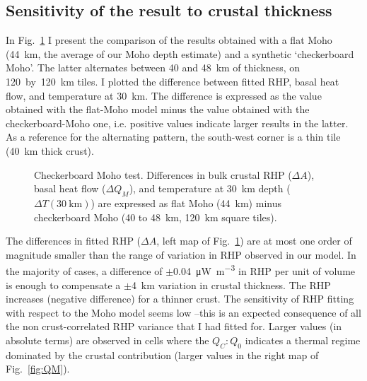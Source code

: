 \subsection{Sensitivity of the result to crustal thickness}
\label{ss:Appl:DiscTherm:Sens}

In Fig.~\ref{fig:CompCheckMoho} I present the comparison of the results obtained with a flat Moho (44~\si{\kilo \metre}, the average of our Moho depth estimate) and a synthetic `checkerboard Moho'.
The latter alternates between \num{40} and \SI{48}{\kilo \metre} of thickness, on \num{120}~by~\SI{120}{\kilo \metre} tiles.
I plotted the difference between fitted RHP, basal heat flow, and temperature at \SI{30}{\kilo \metre}.
The difference is expressed as the value obtained with the flat-Moho model minus the value obtained with the checkerboard-Moho one, i.e. positive values indicate larger results in the latter.
As a reference for the alternating pattern, the south-west corner is a thin tile (\SI{40}{\kilo \metre} thick crust).

\begin{figure}
	\begin{adjustbox}{center}
	\end{adjustbox}
	\caption[Checkerboard Moho test.]{Checkerboard Moho test. Differences in bulk crustal RHP ($\Delta A$), basal heat flow ($\Delta Q_M$), and temperature at \SI{30}{\kilo \metre} depth ($\Delta T(\SI{30}{\kilo \metre})$) are expressed as flat Moho (\SI{44}{\kilo \metre}) minus checkerboard Moho (\num{40} to \SI{48}{\kilo \metre}, \SI{120}{\kilo \metre} square tiles).}
	\label{fig:CompCheckMoho}
\end{figure}

The differences in fitted RHP ($\Delta A$, left map of Fig.~\ref{fig:CompCheckMoho}) are at most one order of magnitude smaller than the range of variation in RHP observed in our model.
In the majority of cases, a difference of $\pm$\SI{0.04}{\micro \watt \per \cubic \metre} in RHP per unit of volume is enough to compensate a $\pm$\SI{4}{\kilo \metre} variation in crustal thickness.
The RHP increases (negative difference) for a thinner crust.
The sensitivity of RHP fitting with respect to the Moho model seems low --this is an expected consequence of all the non crust-correlated RHP variance that I had fitted for.
Larger values (in absolute terms) are observed in cells where the $Q_C:Q_0$ indicates a thermal regime dominated by the crustal contribution (larger values in the right map of Fig.~\ref{fig:QM}).

